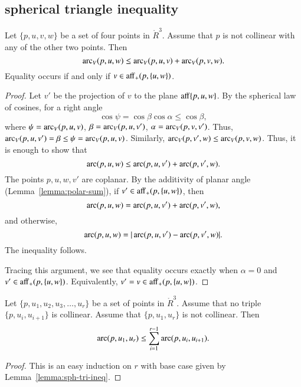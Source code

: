 \subsection{spherical triangle inequality}

\begin{lemma}\label{lemma:sph-tri-ineq}
Let $\{p,u,v,w\}$ be a set of four points in $\ring{R}^3$.
Assume that $p$ is not collinear with any of the other two points.
Then
   $$
   \operatorname{arc}_V(p,u,w) \le \operatorname{arc}_V(p,u,v) + \operatorname{arc}_V(p,v,w).
   $$
Equality occurs if and only if $v\in{\operatorname{aff}}_+(p,\{u,w\})$.
\end{lemma}

\begin{proof} Let $v'$ be the projection of $v$ to the plane
${\operatorname{aff}}\{p,u,w\}$.  
By the spherical law of cosines, for a right angle
   $$
   \cos\psi = \cos\beta\cos\alpha \le \cos\beta,
   $$
where $\psi = \operatorname{arc}_V(p,u,v)$, $\beta = \operatorname{arc}_V(p,u,v')$, $\alpha=\operatorname{arc}_V(p,v,v')$.
Thus, $\operatorname{arc}_V(p,u,v')=\beta\le \psi=\operatorname{arc}_V(p,u,v)$.
Similarly, $\operatorname{arc}_V(p,v',w) \le \operatorname{arc}_V(p,v,w)$.
Thus, it is enough to show that 
  $$
  \operatorname{arc}(p,u,w) \le \operatorname{arc}(p,u,v') + \operatorname{arc}(p,v',w).
  $$
The points $p,u,w,v'$ are coplanar.
By the additivity of planar angle (Lemma~\ref{lemma:polar-sum}), if 
$v'\in {\operatorname{aff}}_+(p,\{u,w\})$, then
   $$
   \operatorname{arc}(p,u,w) = \operatorname{arc}(p,u,v') + \operatorname{arc}(p,v',w),   
   $$
and otherwise,
   $$
   \operatorname{arc}(p,u,w) = |\operatorname{arc}(p,u,v') - \operatorname{arc}(p,v',w)|.
   $$
The inequality follows.

Tracing this argument, we see that equality occurs exactly when
$\alpha=0$ and $v'\in {\operatorname{aff}}_+(p,\{u,w\})$.  Equivalently,
$v'=v\in{\operatorname{aff}}_+(p,\{u,w\})$.
\end{proof}

\begin{lemma}\label{lemma:sph-tri-multi}
Let $\{p,u_1,u_2,u_3,\ldots,u_r\}$ be a set of points in $\ring{R}^3$.
Assume that no triple $\{p,u_i,u_{i+1}\}$ is collinear.  Assume
that $\{p,u_1,u_r\}$ is not collinear.  Then
$$
  \operatorname{arc}(p,u_1,u_r) \le \sum_{i=1}^{r-1} \operatorname{arc}(p,u_i,u_{i+1}).
$$
\end{lemma}

\begin{proof} This is an easy induction on $r$ with base
case given by Lemma~\ref{lemma:sph-tri-ineq}.
\end{proof}
